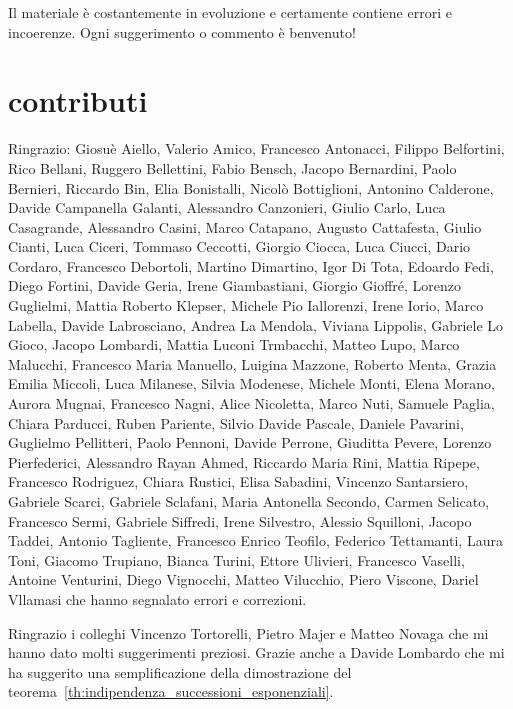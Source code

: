 Il materiale è costantemente in evoluzione %
e certamente contiene errori e incoerenze. Ogni suggerimento o commento è %
benvenuto! %


\section*{contributi}

Ringrazio:
%
Giosuè Aiello,
Valerio Amico,
Francesco Antonacci,
Filippo Belfortini,
Rico Bellani,
Ruggero Bellettini,
Fabio Bensch,
Jacopo Bernardini,
Paolo Bernieri,
Riccardo Bin,
Elia Bonistalli,
Nicolò Bottiglioni,
Antonino Calderone,
Davide Campanella Galanti,
Alessandro Canzonieri,
Giulio Carlo,
Luca Casagrande,
Alessandro Casini,
Marco Catapano,
Augusto Cattafesta,
Giulio Cianti,
Luca Ciceri,
Tommaso Ceccotti,
Giorgio Ciocca,
Luca Ciucci,
Dario Cordaro,
Francesco Debortoli,
Martino Dimartino,
Igor Di Tota,
Edoardo Fedi,
Diego Fortini,
Davide Geria,
Irene Giambastiani,
Giorgio Gioffré,
Lorenzo Guglielmi,
Mattia Roberto Klepser,
Michele Pio Iallorenzi,
Irene Iorio,
Marco Labella,
Davide Labrosciano,
Andrea La Mendola,
Viviana Lippolis,
Gabriele Lo Gioco,
Jacopo Lombardi,
Mattia Luconi Trmbacchi,
Matteo Lupo,
Marco Malucchi,
Francesco Maria Manuello,
Luigina Mazzone,
Roberto Menta,
Grazia Emilia Miccoli,
Luca Milanese,
Silvia Modenese,
Michele Monti,
Elena Morano,
Aurora Mugnai,
Francesco Nagni,
Alice Nicoletta,
Marco Nuti,
Samuele Paglia,
Chiara Parducci,
Ruben Pariente,
Silvio Davide Pascale,
Daniele Pavarini,
Guglielmo Pellitteri,
Paolo Pennoni,
Davide Perrone,
Giuditta Pevere,
Lorenzo Pierfederici,
Alessandro Rayan Ahmed,
Riccardo Maria Rini,
Mattia Ripepe,
Francesco Rodriguez,
Chiara Rustici,
Elisa Sabadini,
Vincenzo Santarsiero,
Gabriele Scarci,
Gabriele Sclafani,
Maria Antonella Secondo,
Carmen Selicato,
Francesco Sermi,
Gabriele Siffredi,
Irene Silvestro,
Alessio Squilloni,
Jacopo Taddei,
Antonio Tagliente,
Francesco Enrico Teofilo,
Federico Tettamanti,
Laura Toni,
Giacomo Trupiano,
Bianca Turini,
Ettore Ulivieri,
Francesco Vaselli,
Antoine Venturini,
Diego Vignocchi,
Matteo Vilucchio,
Piero Viscone,
Dariel Vllamasi
%
che hanno segnalato errori e correzioni.

Ringrazio i colleghi Vincenzo Tortorelli, Pietro Majer
e Matteo Novaga
che mi hanno dato molti suggerimenti preziosi.
Grazie anche a Davide Lombardo che mi ha suggerito una semplificazione 
della dimostrazione del teorema~\ref{th:indipendenza_successioni_esponenziali}.

\newpage

